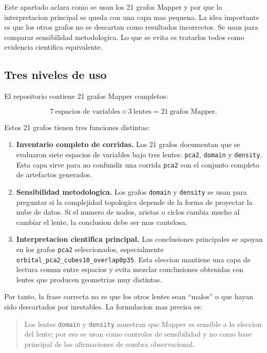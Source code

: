 Este apartado aclara como se usan los 21 grafos Mapper y por que la interpretacion principal se queda con una capa mas pequena. La idea importante es que los otros grafos no se descartan como resultados incorrectos. Se usan para comparar sensibilidad metodologica. Lo que se evita es tratarlos todos como evidencia cientifica equivalente.

\subsection*{Tres niveles de uso}

El repositorio contiene 21 grafos Mapper completos:

\[
7\ \text{espacios de variables} \times 3\ \text{lentes}
= 21\ \text{grafos Mapper}.
\]

Estos 21 grafos tienen tres funciones distintas:

\begin{enumerate}
    \item \textbf{Inventario completo de corridas.} Los 21 grafos documentan que se evaluaron siete espacios de variables bajo tres lentes: \texttt{pca2}, \texttt{domain} y \texttt{density}. Esta capa sirve para no confundir una corrida \texttt{pca2} con el conjunto completo de artefactos generados.
    \item \textbf{Sensibilidad metodologica.} Los grafos \texttt{domain} y \texttt{density} se usan para preguntar si la complejidad topologica depende de la forma de proyectar la nube de datos. Si el numero de nodos, aristas o ciclos cambia mucho al cambiar el lente, la conclusion debe ser mas cautelosa.
    \item \textbf{Interpretacion cientifica principal.} Las conclusiones principales se apoyan en los grafos \texttt{pca2} seleccionados, especialmente \texttt{orbital\_pca2\_cubes10\_overlap0p35}. Esta eleccion mantiene una capa de lectura comun entre espacios y evita mezclar conclusiones obtenidas con lentes que producen geometrias muy distintas.
\end{enumerate}

Por tanto, la frase correcta no es que los otros lentes sean ``malos'' o que hayan sido descartados por inestables. La formulacion mas precisa es:

\begin{quote}
Los lentes \texttt{domain} y \texttt{density} muestran que Mapper es sensible a la eleccion del lente; por eso se usan como controles de sensibilidad y no como base principal de las afirmaciones de sombra observacional.
\end{quote}

